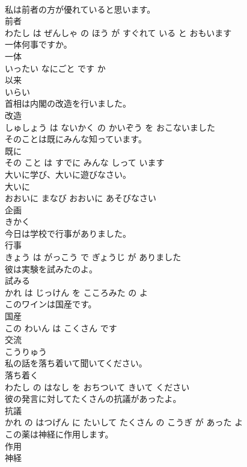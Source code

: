 \documentclass[8pt]{extreport}
\begin{document}
\begin{CJK}{UTF8}{min}
\\	私は前者の方が優れていると思います。	
\\	前者 
\\	わたし は ぜんしゃ の ほう が すぐれて いる と おもいます		
\\	一体何事ですか。	
\\	一体 
\\	いったい なにごと です か		
\\	以来	
\\	いらい		
\\	首相は内閣の改造を行いました。	
\\	改造 
\\	しゅしょう は ないかく の かいぞう を おこないました		
\\	そのことは既にみんな知っています。	
\\	既に 
\\	その こと は すでに みんな しって います		
\\	大いに学び、大いに遊びなさい。	
\\	大いに 
\\	おおいに まなび おおいに あそびなさい		
\\	企画	
\\	きかく		
\\	今日は学校で行事がありました。	
\\	行事 
\\	きょう は がっこう で ぎょうじ が ありました		
\\	彼は実験を試みたのよ。	
\\	試みる 
\\	かれ は じっけん を こころみた の よ		
\\	このワインは国産です。	
\\	国産 
\\	この わいん は こくさん です		
\\	交流	
\\	こうりゅう		
\\	私の話を落ち着いて聞いてください。	
\\	落ち着く 
\\	わたし の はなし を おちついて きいて ください		
\\	彼の発言に対してたくさんの抗議があったよ。	
\\	抗議 
\\	かれ の はつげん に たいして たくさん の こうぎ が あった よ		
\\	この薬は神経に作用します。	
\\	作用 
\\	神経 

\end{CJK}
\end{document}
